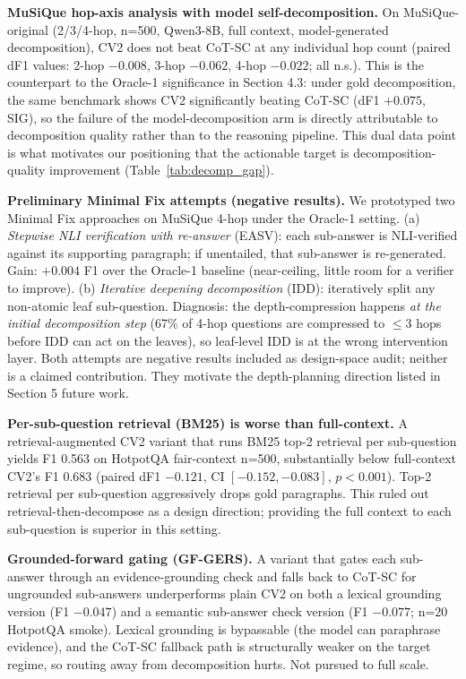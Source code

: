 \documentclass[11pt,a4paper]{article}
\begin{document}
\textbf{MuSiQue hop-axis analysis with model self-decomposition.} On MuSiQue-original (2/3/4-hop, n=500, Qwen3-8B, full context, model-generated decomposition), CV2 does not beat CoT-SC at any individual hop count (paired dF1 values: 2-hop $-0.008$, 3-hop $-0.062$, 4-hop $-0.022$; all n.s.). This is the counterpart to the Oracle-1 significance in Section 4.3: under gold decomposition, the same benchmark shows CV2 significantly beating CoT-SC (dF1 $+0.075$, SIG), so the failure of the model-decomposition arm is directly attributable to decomposition quality rather than to the reasoning pipeline. This dual data point is what motivates our positioning that the actionable target is decomposition-quality improvement (Table~\ref{tab:decomp_gap}).

\textbf{Preliminary Minimal Fix attempts (negative results).} We prototyped two Minimal Fix approaches on MuSiQue 4-hop under the Oracle-1 setting. (a) \emph{Stepwise NLI verification with re-answer} (EASV): each sub-answer is NLI-verified against its supporting paragraph; if unentailed, that sub-answer is re-generated. Gain: $+0.004$ F1 over the Oracle-1 baseline (near-ceiling, little room for a verifier to improve). (b) \emph{Iterative deepening decomposition} (IDD): iteratively split any non-atomic leaf sub-question. Diagnosis: the depth-compression happens \emph{at the initial decomposition step} (67\% of 4-hop questions are compressed to $\leq 3$ hops before IDD can act on the leaves), so leaf-level IDD is at the wrong intervention layer. Both attempts are negative results included as design-space audit; neither is a claimed contribution. They motivate the depth-planning direction listed in Section 5 future work.

\textbf{Per-sub-question retrieval (BM25) is worse than full-context.} A retrieval-augmented CV2 variant that runs BM25 top-2 retrieval per sub-question yields F1 0.563 on HotpotQA fair-context n=500, substantially below full-context CV2's F1 0.683 (paired dF1 $-0.121$, CI $[-0.152, -0.083]$, $p<0.001$). Top-2 retrieval per sub-question aggressively drops gold paragraphs. This ruled out retrieval-then-decompose as a design direction; providing the full context to each sub-question is superior in this setting.

\textbf{Grounded-forward gating (GF-GERS).} A variant that gates each sub-answer through an evidence-grounding check and falls back to CoT-SC for ungrounded sub-answers underperforms plain CV2 on both a lexical grounding version (F1 $-0.047$) and a semantic sub-answer check version (F1 $-0.077$; n=20 HotpotQA smoke). Lexical grounding is bypassable (the model can paraphrase evidence), and the CoT-SC fallback path is structurally weaker on the target regime, so routing away from decomposition hurts. Not pursued to full scale.
\end{document}

